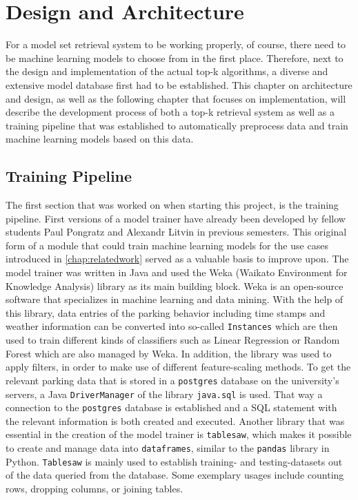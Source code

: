 \chapter{Design and Architecture} \label{chap:design}

For a model set retrieval system to be working properly, of course, there need to be machine learning models to choose from in the first place. Therefore, next to the design and implementation of the actual top-k algorithms, a diverse and extensive model database first had to be established. This chapter on architecture and design, as well as the following chapter that focuses on implementation, will describe the development process of both a top-k retrieval system as well as a training pipeline that was established to automatically preprocess data and train machine learning models based on this data.

\section{Training Pipeline}

The first section that was worked on when starting this project, is the training pipeline. First versions of a model trainer have already been developed by fellow students Paul Pongratz and Alexandr Litvin in previous semesters. This original form of a module that could train machine learning models for the use cases introduced in \autoref{chap:relatedwork} served as a valuable basis to improve upon. The model trainer was written in Java and used the Weka (Waikato Environment for Knowledge Analysis) \cite{eibe2016} library as its main building block. Weka is an open-source software that specializes in machine learning and data mining. With the help of this library, data entries of the parking behavior including time stamps and weather information can be converted into so-called \texttt{Instances} which are then used to train different kinds of classifiers such as Linear Regression or Random Forest which are also managed by Weka. In addition, the library was used to apply filters, in order to make use of different feature-scaling methods. To get the relevant parking data that is stored in a \texttt{postgres} database on the university's servers, a Java \texttt{DriverManager} of the library \texttt{java.sql} is used. That way a connection to the \texttt{postgres} database is established and a SQL statement with the relevant information is both created and executed. Another library that was essential in the creation of the model trainer is \texttt{tablesaw}, which makes it possible to create and manage data into \texttt{dataframes}, similar to the \texttt{pandas} library in Python. \texttt{Tablesaw} is mainly used to establish training- and testing-datasets out of the data queried from the database. Some exemplary usages include counting rows, dropping columns, or joining tables. 

